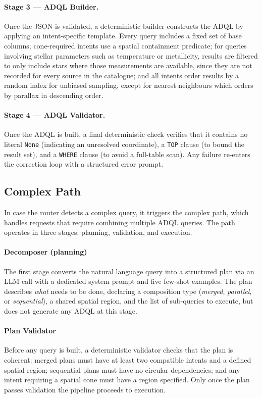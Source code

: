 \documentclass[fleqn,moreauthors,10pt]{ds_report}
\begin{document}
\paragraph{Stage 3 --- ADQL Builder.}

Once the JSON is validated, a deterministic builder constructs the ADQL by 
applying an intent-specific template. Every query includes a fixed set of base 
columns; cone-required intents use a spatial containment predicate; for queries 
involving stellar parameters such as temperature or metallicity, results are 
filtered to only include stars where those measurements are available, since 
they are not recorded for every source in the catalogue; and all intents order 
results by a random index for unbiased sampling, except for nearest neighbours 
which orders by parallax in descending order.

\paragraph{Stage 4 --- ADQL Validator.}
Once the ADQL is built, a final deterministic check verifies that it contains no literal \texttt{None} (indicating an unresolved coordinate), a \texttt{TOP} clause (to bound the result set), and a \texttt{WHERE} clause (to avoid a full-table scan). Any failure re-enters the correction loop with a structured error prompt.

\subsection{Complex Path}

In case the router detects a complex query, it triggers the complex path, which 
handles requests that require combining multiple ADQL queries. The path operates 
in three stages: planning, validation, and execution.
  
\paragraph{Decomposer (planning)}
The first stage converts the natural language query into a structured plan via 
an LLM call with a dedicated system prompt and five few-shot examples. The plan 
describes \emph{what} needs to be done, declaring a composition type 
(\textit{merged}, \textit{parallel}, or \textit{sequential}), a shared spatial 
region, and the list of sub-queries to execute, but does not generate any 
ADQL at this stage.

\paragraph{Plan Validator}
Before any query is built, a deterministic validator checks that the plan is 
coherent: merged plans must have at least two compatible intents and a defined 
spatial region; sequential plans must have no circular dependencies; and any 
intent requiring a spatial cone must have a region specified. Only once the 
plan passes validation the pipeline proceeds to execution.
\end{document}
